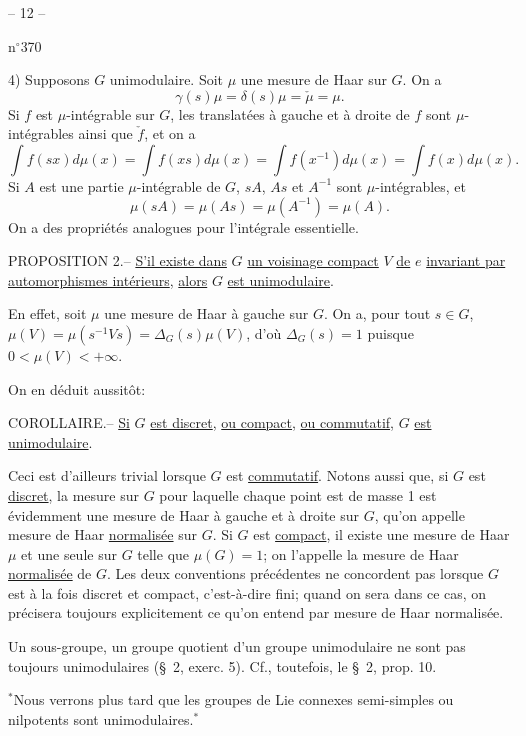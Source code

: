 \begin{center}-- 12 --\end{center}\hfill n$^\circ$370

4) Supposons $G$ unimodulaire. Soit $\mu$ une mesure de Haar sur $G$. On a
\[
\tag{26}\gamma(s)\mu=\delta(s)\mu=\check\mu=\mu.
\]
Si $f$ est $\mu$-intégrable sur $G$, les translatées à gauche et à droite de $f$ sont $\mu$-intégrables ainsi que $\check f$, et on a
\[
\tag{27}\int f(sx)d\mu(x)=\int f(xs)d\mu(x)=\int f(x^{-1})d\mu(x)=\int f(x)d\mu(x).
\]
Si $A$ est une partie $\mu$-intégrable de $G$, $sA$, $As$ et $A^{-1}$ sont $\mu$-intégrables, et
\[
\tag{28}\mu(sA)=\mu(As)=\mu(A^{-1})=\mu(A).
\]
On a des propriétés analogues pour l'intégrale essentielle.

PROPOSITION 2.-- \uline{S'il existe dans} $G$ \uline{un voisinage compact} $V$ \uline{de} $e$ \uline{invariant par automorphismes intérieurs}, \uline{alors} $G$ \uline{est unimodulaire}.

En effet, soit $\mu$ une mesure de Haar à gauche sur $G$.
On a, pour tout $s\in G$,
$\mu(V)=\mu(s^{-1}Vs)=\Delta_G(s)\mu(V)$, d'où $\Delta_G(s)=1$ puisque $0<\mu(V)<+\infty$.

On en déduit aussitôt:

COROLLAIRE.-- \uline{Si} $G$ \uline{est discret}, \uline{ou compact}, \uline{ou commutatif}, $G$ \uline{est unimodulaire}.

Ceci est d'ailleurs trivial lorsque $G$ est \uline{commutatif}.
Notons aussi que, si $G$ est \uline{discret}, la mesure sur $G$ pour laquelle chaque point est de masse 1 est évidemment une mesure de Haar à gauche et à droite sur $G$, qu'on appelle mesure de Haar \uline{normalisée} sur $G$.
Si $G$ est \uline{compact}, il existe une mesure de Haar $\mu$ et une seule sur $G$ telle que $\mu(G)=1$; on l'appelle la mesure de Haar \uline{normalisée} de $G$.
Les deux conventions précédentes ne concordent pas lorsque $G$ est à la fois discret et compact, c'est-à-dire fini; quand on sera dans ce cas, on précisera toujours explicitement ce qu'on entend par mesure de Haar normalisée.

Un sous-groupe, un groupe quotient d'un groupe unimodulaire ne sont pas toujours unimodulaires (\S\ 2, exerc. 5). Cf., toutefois, le \S\ 2, prop. 10.

$^*$Nous verrons plus tard que les groupes de Lie connexes semi-simples ou nilpotents sont unimodulaires.$^*$

